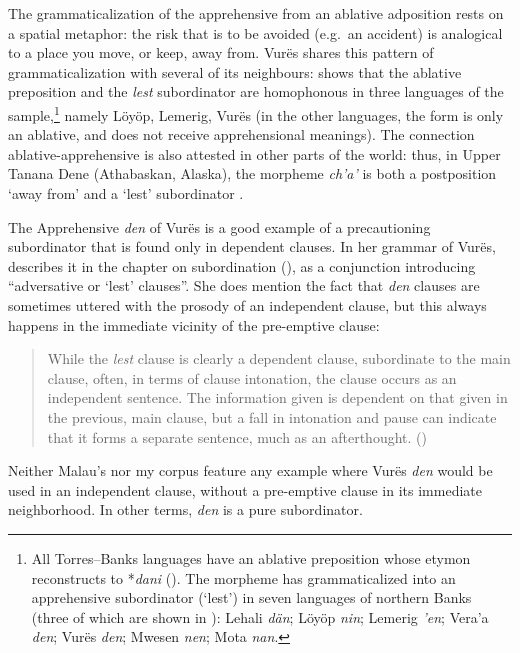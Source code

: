 \documentclass[output=paper,colorlinks,citecolor=brown]{langscibook}
\begin{document}
The grammaticalization of the apprehensive from an ablative adposition rests on a spatial metaphor: the risk that is to be avoided (e.g.\ an accident) is analogical to a place you move, or keep, away from. Vurës shares this pattern of grammaticalization with several of its neighbours:  shows that the ablative preposition and the \textit{lest} subordinator are homophonous in three languages of the sample,\footnote{All Torres–Banks languages have an ablative preposition whose etymon reconstructs to *\textit{dani} (\citealt[494]{François2005b}). The morpheme has grammaticalized into an apprehensive subordinator (`lest') in seven languages of northern Banks (three of which are shown in ): Lehali \textit{dän}; Löyöp \textit{nin}; Lemerig \textit{'en}; Vera'a \textit{den}; Vurës \textit{den}; Mwesen \textit{nen}; Mota \textit{nan}.} namely Löyöp, Lemerig, Vurës (in the other languages, the form is only an ablative, and does not receive apprehensional meanings). The connection ablative-apprehensive is also attested in other parts of the world: thus, in Upper Tanana Dene (Athabaskan, Alaska), the morpheme \textit{ch'a'} is both a postposition `away from' and a `lest' subordinator \citep{chapters/lovick}. 

The Apprehensive \textit{den} of Vurës is a good example of a precautioning subordinator that is found only in dependent clauses. In her grammar of Vurës, \citeauthor{Malau2016} describes it in the chapter on subordination (\citeyear[677ff]{Malau2016}), as a conjunction introducing ``adversative or `lest' clauses''. She does mention the fact that \textit{den} clauses are sometimes uttered with the prosody of an independent clause, but this always happens in the immediate vicinity of the pre-emptive clause:

\begin{quote}
    While the \textit{lest} clause is clearly a dependent clause, subordinate to the main clause, often, in terms of clause intonation, the clause occurs as an independent sentence. The information given is dependent on that given in the previous, main clause, but a fall in intonation and pause can indicate that it forms a separate sentence, much as an afterthought. (\citealt[679]{Malau2016})
\end{quote}

Neither Malau's nor my corpus feature any example where Vurës  \textit{den} would be used in an independent clause, without a pre-emptive clause in its immediate neighborhood. In other terms, \textit{den} is a pure subordinator.
\end{document}
